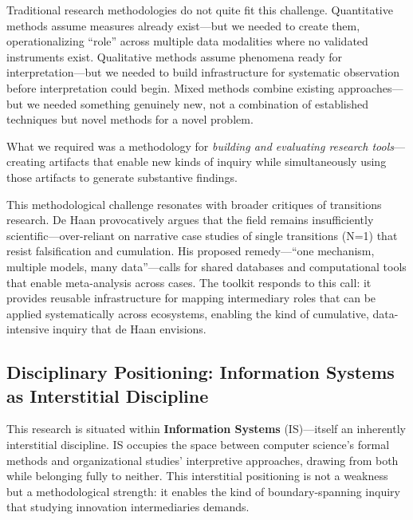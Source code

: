 \documentclass[../main.tex]{subfiles}
\begin{document}
Traditional research methodologies do not quite fit this challenge. Quantitative methods assume measures already exist---but we needed to create them, operationalizing ``role'' across multiple data modalities where no validated instruments exist. Qualitative methods assume phenomena ready for interpretation---but we needed to build infrastructure for systematic observation before interpretation could begin. Mixed methods combine existing approaches---but we needed something genuinely new, not a combination of established techniques but novel methods for a novel problem.

What we required was a methodology for \textit{building and evaluating research tools}---creating artifacts that enable new kinds of inquiry while simultaneously using those artifacts to generate substantive findings.

This methodological challenge resonates with broader critiques of transitions research. De Haan \citeyear{dehaan2025makingscience} provocatively argues that the field remains insufficiently scientific---over-reliant on narrative case studies of single transitions (N=1) that resist falsification and cumulation. His proposed remedy---``one mechanism, multiple models, many data''---calls for shared databases and computational tools that enable meta-analysis across cases. The \RoleBox{} toolkit responds to this call: it provides reusable infrastructure for mapping intermediary roles that can be applied systematically across ecosystems, enabling the kind of cumulative, data-intensive inquiry that de Haan envisions.


\subsection{Disciplinary Positioning: Information Systems as Interstitial Discipline}

This research is situated within \textbf{Information Systems} (IS)---itself an inherently interstitial discipline. IS occupies the space between computer science's formal methods and organizational studies' interpretive approaches, drawing from both while belonging fully to neither. This interstitial positioning is not a weakness but a methodological strength: it enables the kind of boundary-spanning inquiry that studying innovation intermediaries demands.
\end{document}
